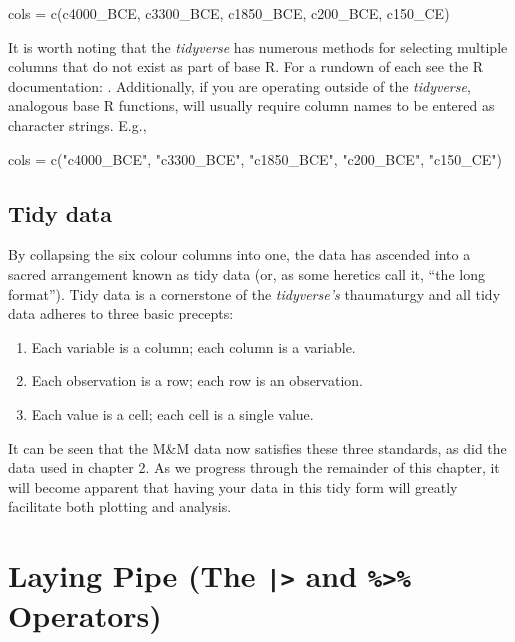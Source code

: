 \begin{inR}
cols = c(c4000_BCE, c3300_BCE, c1850_BCE, c200_BCE, c150_CE)
\end{inR}
\vspace{1em}

\noindent It is worth noting that the \textit{tidyverse} has numerous methods for selecting multiple columns that do not exist as part of base R. For a rundown of each see the R documentation: . Additionally, if you are operating outside of the \textit{tidyverse}, analogous base R functions, will usually require column names to be entered as character strings. E.g.,

\begin{inR}
cols = c("c4000_BCE", "c3300_BCE", "c1850_BCE", "c200_BCE", "c150_CE")
\end{inR}
\vspace{1em}

\subsection{Tidy data}

By collapsing the six colour columns into one, the data has ascended into a sacred arrangement known as \gls{tidy data} (or, as some heretics call it, ``the long format'').  Tidy data is a cornerstone of the \textit{tidyverse's} thaumaturgy and all tidy data adheres to three basic precepts:

\begin{minipage}{\textwidth}

\begin{enumerate}[label=\Roman*.]
\IMFellEnglish
    \item Each variable is a column; each column is a variable.
    \item Each observation is a row; each row is an observation.
    \item Each value is a cell; each cell is a single value.
\end{enumerate}
\end{minipage}

\noindent
It can be seen that the M\&M data now satisfies these three standards, as did the  data used in chapter 2. As we progress through the remainder of this chapter, it will become apparent that having your data in this tidy form will greatly facilitate both plotting and analysis. 


\section{Laying Pipe (The \texttt{|>} and \texttt{\%>\%} Operators)}

